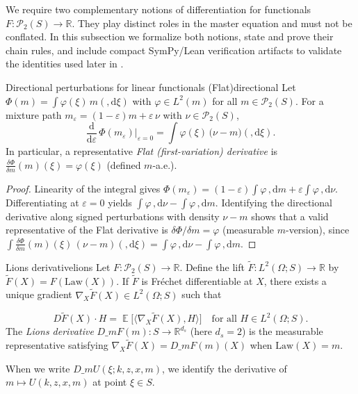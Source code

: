 ﻿\documentclass[11pt,letterpaper,oneside]{article}
\numberwithin{equation}{section}
\DeclareMathOperator{\E}{\mathbb{E}}
\newcommand{\R}{\mathbb{R}}
\newcommand{\1}{\mathbf{1}}
\newcommand{\diff}{,\mathrm{d}}
\newcommand{\dmU}{D\_m U}
\newcommand{\Dm}{D\_m}
\newcommand{\ip}[2]{\langle #1,#2\rangle}
\begin{document}
We require two complementary notions of differentiation for functionals $F:\mathcal P_2(S)\to\R$. They play distinct roles in the master equation and must not be conflated. In this subsection we formalize both notions, state and prove their chain rules, and include compact SymPy/Lean verification artifacts to validate the identities used later in .

\begin{lemma}{Directional perturbations for linear functionals (Flat)}{directional}
Let $\Phi(m)=\int \varphi(\xi)\,m(\diff \xi)$ with $\varphi\in L^2(m)$ for all $m\in\mathcal P_2(S)$. For a mixture path $m_\varepsilon=(1-\varepsilon)m+\varepsilon\,\nu$ with $\nu\in\mathcal P_2(S)$,
\[
\frac{\mathrm d}{\mathrm d\varepsilon}\,\Phi(m_\varepsilon)\Big|_{\varepsilon=0}
= \int \varphi(\xi)\,\big(\nu-m\big)(\diff\xi).
\]
In particular, a representative \emph{Flat (first-variation) derivative} is $\tfrac{\delta \Phi}{\delta m}(m)(\xi)=\varphi(\xi)$ (defined $m$-a.e.).
\end{lemma}

\begin{proof}
Linearity of the integral gives $\Phi(m_\varepsilon)=(1-\varepsilon)\int\varphi\,\diff m+\varepsilon\int\varphi\,\diff\nu$. Differentiating at $\varepsilon=0$ yields $\int\varphi\,\diff\nu-\int\varphi\,\diff m$. Identifying the directional derivative along signed perturbations with density $\nu-m$ shows that a valid representative of the Flat derivative is $\delta\Phi/\delta m=\varphi$ (measurable $m$-version), since $\int \tfrac{\delta\Phi}{\delta m}(m)(\xi)\, (\nu-m)(\diff\xi)=\int\varphi\,\diff\nu-\int\varphi\,\diff m$.
\end{proof}

\begin{definition}{Lions derivative}{lions}
Let $F:\mathcal P_2(S)\to\R$. Define the lift $\tilde F: L^2(\Omega;S)\to\R$ by $\tilde F(X)=F(\mathrm{Law}(X))$. If $\tilde F$ is Fr\'echet differentiable at $X$, there exists a unique gradient $\nabla_X\tilde F(X)\in L^2(\Omega;S)$ such that

$$
D\tilde F(X)\cdot H = \E\big[\ip{ \nabla_X\tilde F(X)}{H}\big]\quad\text{for all }H\in L^2(\Omega;S).
$$
The \emph{Lions derivative} $\Dm F(m):S\to\R^{d_s}$ (here $d_s=2$) is the measurable representative satisfying $\nabla_X\tilde F(X)=\Dm F(m)(X)$ when $\mathrm{Law}(X)=m$.

When we write $\dmU(\xi;k,z,x,m)$, we identify the derivative of $m\mapsto U(k,z,x,m)$ at point $\xi\in S$.
\end{definition}
\end{document}
